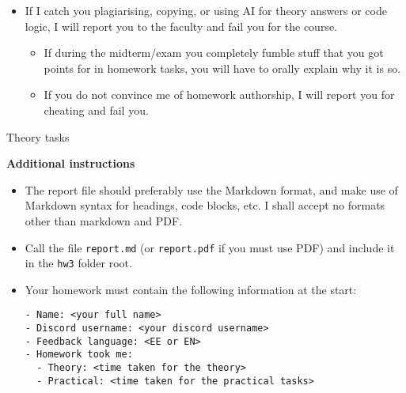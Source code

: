 \documentclass{homework}
\begin{document}
\begin{itemize}
\begin{itemize}
  \end{itemize}
  \item If I catch you plagiarising, copying, or using AI for theory answers or code logic, I will report you to the faculty and fail you for the course.
  \begin{itemize}
    \item If during the midterm/exam you completely fumble stuff that you got points for in homework tasks, you will have to orally explain why it is so.
    \item If you do not convince me of homework authorship, I will report you for cheating and fail you.
  \end{itemize}
\end{itemize}

\newpage

\begin{center}
  Theory tasks
\end{center}

\textbf{Additional instructions}

\begin{itemize}
  \item The report file should preferably use the Markdown format, and make use of Markdown syntax for headings, code blocks, etc.
  I shall accept no formats other than markdown and PDF.
  \item Call the file \texttt{report.md} (or \texttt{report.pdf} if you must use PDF) and include it in the \texttt{hw3} folder root.
  \item Your homework must contain the following information at the start:
\begin{Verbatim}
- Name: <your full name>
- Discord username: <your discord username>
- Feedback language: <EE or EN>
- Homework took me:
  - Theory: <time taken for the theory>
  - Practical: <time taken for the practical tasks>
\end{Verbatim}
\end{itemize}
\end{document}
